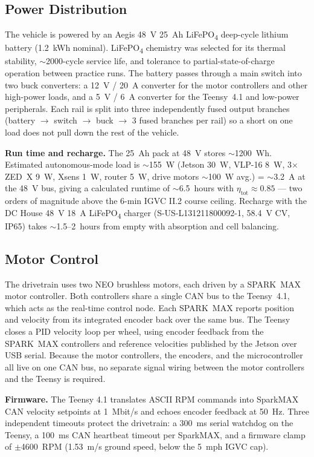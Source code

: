 \documentclass[12pt, letterpaper]{article}
\begin{document}
\subsection{Power Distribution}

The vehicle is powered by an Aegis 48~V 25~Ah LiFePO\textsubscript{4} deep-cycle
lithium battery (1.2~kWh nominal). LiFePO\textsubscript{4} chemistry was selected for
its thermal stability, $\sim$2000-cycle service life, and tolerance to partial-state-of-charge
operation between practice runs. The battery passes through a main switch into two
buck converters: a 12~V / 20~A
converter for the motor controllers and other high-power loads, and a 5~V / 6~A
converter for the Teensy~4.1 and low-power peripherals. Each rail is split into three
independently fused output branches (battery $\to$ switch $\to$ buck $\to$ 3 fused
branches per rail) so a short on one load does not pull down the rest of the vehicle.

\textbf{Run time and recharge.} The 25~Ah pack at 48~V stores $\sim$1200~Wh. Estimated
autonomous-mode load is $\sim$155~W (Jetson 30~W, VLP-16 8~W, 3$\times$ ZED~X 9~W,
Xsens 1~W, router 5~W, drive motors $\sim$100~W avg.) = $\sim$3.2~A at the 48~V bus,
giving a calculated runtime of $\sim$6.5~hours with $\eta_{\text{tot}} \approx 0.85$
--- two orders of magnitude above the 6-min IGVC II.2 course ceiling. Recharge with
the DC House 48~V 18~A LiFePO\textsubscript{4} charger (S-US-L131211800092-1, 58.4~V
CV, IP65) takes $\sim$1.5--2~hours from empty with absorption and cell balancing.

\subsection{Motor Control}

The drivetrain uses two NEO brushless motors, each driven by a SPARK~MAX motor
controller. Both controllers share a single CAN bus to the Teensy~4.1, which acts as the
real-time control node. Each SPARK~MAX reports position and velocity from its integrated
encoder back over the same bus. The Teensy closes a PID velocity loop per wheel, using
encoder feedback from the SPARK~MAX controllers and reference velocities published by
the Jetson over USB serial. Because the motor controllers, the encoders, and the
microcontroller all live on one CAN bus, no separate signal wiring between the motor
controllers and the Teensy is required.

\textbf{Firmware.} The Teensy 4.1 translates ASCII RPM commands into SparkMAX CAN
velocity setpoints at 1~Mbit/s and echoes encoder feedback at 50~Hz. Three independent
timeouts protect the drivetrain: a 300~ms serial watchdog on the Teensy, a 100~ms CAN
heartbeat timeout per SparkMAX, and a firmware clamp of $\pm$4600~RPM (1.53~m/s ground
speed, below the 5~mph IGVC cap).
\end{document}
